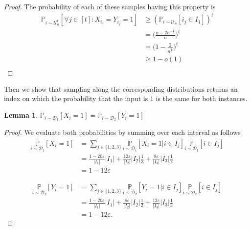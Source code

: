 \documentclass[11pt]{article}
\newtheorem{lemma}[theorem]{Lemma}
\newcommand{\sU}{\mathcal{U}}
\begin{document}
\begin{proof}
The probability of each of these samples having this property is 
\[
\begin{split}
    \mathbb{P}_{i\sim \sU_{n}^{t}}\left [\forall j\in [t]: X_{i_j}=Y_{i_j}=1\right ] &\geq (\mathbb{P}_{i\sim \sU_{n}}\left [i_j\in I_{1}\right ])^{t}\\
    &=\bigg(\frac{n-2n^{-\frac{2}{3}}}{n}\bigg)^{t}\\
    &=\bigg(1-\frac{2}{n^{\frac{1}{3}}}\bigg)^{t}\\
    &\geq 1-o(1)\\
\end{split}
\]
\end{proof}

Then we show that sampling along the corresponding distributions returns an index on which the probability that the input is $1$ is the same for both instances. 
\begin{lemma}\label{dsamps}
$\mathbb{P}_{i\sim \mathcal{D}_{1}}\left [X_{i}=1\right ]=\mathbb{P}_{i\sim \mathcal{D}_{2}}\left [Y_{i}=1\right ]$
\end{lemma}

\begin{proof}
We evaluate both probabilities by summing over each interval as follows
\[
\begin{split}
\underset{i\sim \mathcal{D}_{1}}{\mathbb{P}}\left [X_{i}=1\right ]&=\sum_{j\in\{1,2,3\}}\underset{i\sim \mathcal{D}_{1}}{\mathbb{P}}\left [X_{i}=1\vert i\in I_{j}\right ]\underset{i\sim \mathcal{D}_{1}}{\mathbb{P}}\left [i\in I_{j}\right ]\\
&=\frac{1-20\varepsilon}{|I_{1}|}|I_{1}|+\frac{12\varepsilon}{|I_{2}|}|I_{2}|\frac{1}{3}+\frac{8\varepsilon}{|I_{3}|}|I_{3}|\frac{1}{2}\\
&=1-12\varepsilon
\end{split}
\]

\[
\begin{split}
\underset{i\sim \mathcal{D}_{2}}{\mathbb{P}}\left [Y_{i}=1\right ]&=\sum_{j\in\{1,2,3\}}\underset{i\sim \mathcal{D}_{2}}{\mathbb{P}}\left [Y_{i}=1\vert i\in I_{j}\right ]\underset{i\sim \mathcal{D}_{2}}{\mathbb{P}}\left [i\in I_{j}\right]\\
&=\frac{1-20\varepsilon}{|I_{1}|}|I_{1}|+\frac{8\varepsilon}{|I_{2}|}|I_{2}|\frac{1}{2}+\frac{12\varepsilon}{|I_{3}|}|I_{3}|\frac{1}{3}\\
&=1-12\varepsilon.
\end{split}
\]
\end{proof}
\end{document}
